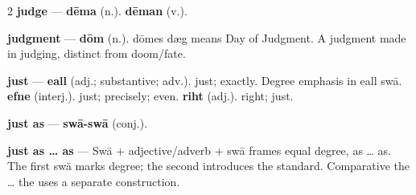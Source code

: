 \begin{multicols}{2}
\textbf{judge} — \textbf{dēma} (n.).  \textbf{dēman} (v.).\par
\textbf{judgment} — \textbf{dōm} (n.). dōmes dæg means Day of Judgment. A judgment made in judging, distinct from doom/fate.\par
\textbf{just} — \textbf{eall} (adj.; substantive; adv.). just; exactly. Degree emphasis in eall swā. \textbf{efne} (interj.). just; precisely; even. \textbf{riht} (adj.). right; just.\par
\textbf{just as} — \textbf{swā-swā} (conj.).\par
\textbf{just as … as} — Swā + adjective/adverb + swā frames equal degree, as … as. The first swā marks degree; the second introduces the standard. Comparative the … the uses a separate construction.\par

\end{multicols}
